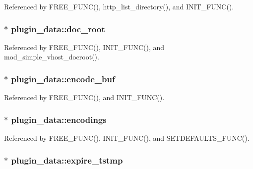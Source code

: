 Referenced by F\-R\-E\-E\-\_\-\-F\-U\-N\-C(), http\-\_\-list\-\_\-directory(), and I\-N\-I\-T\-\_\-\-F\-U\-N\-C().

\hypertarget{structplugin__data_a342f1b1bdc9bf699b19bfe32483d24a5}{
\subsubsection[{doc\-\_\-root}]{$\ast$ plugin\-\_\-data\-::doc\-\_\-root}}\label{structplugin__data_a342f1b1bdc9bf699b19bfe32483d24a5}


Referenced by F\-R\-E\-E\-\_\-\-F\-U\-N\-C(), I\-N\-I\-T\-\_\-\-F\-U\-N\-C(), and mod\-\_\-simple\-\_\-vhost\-\_\-docroot().

\hypertarget{structplugin__data_a2c4aaed97abc0e07dd9bd98f163e0aa8}{
\subsubsection[{encode\-\_\-buf}]{$\ast$ plugin\-\_\-data\-::encode\-\_\-buf}}\label{structplugin__data_a2c4aaed97abc0e07dd9bd98f163e0aa8}


Referenced by F\-R\-E\-E\-\_\-\-F\-U\-N\-C(), and I\-N\-I\-T\-\_\-\-F\-U\-N\-C().

\hypertarget{structplugin__data_a0ca98bb7bcec53210ee355e65457fb41}{
\subsubsection[{encodings}]{$\ast$ plugin\-\_\-data\-::encodings}}\label{structplugin__data_a0ca98bb7bcec53210ee355e65457fb41}


Referenced by F\-R\-E\-E\-\_\-\-F\-U\-N\-C(), I\-N\-I\-T\-\_\-\-F\-U\-N\-C(), and S\-E\-T\-D\-E\-F\-A\-U\-L\-T\-S\-\_\-\-F\-U\-N\-C().

\hypertarget{structplugin__data_ab7ad8e68f07c14a0f4d95da970387826}{
\subsubsection[{expire\-\_\-tstmp}]{$\ast$ plugin\-\_\-data\-::expire\-\_\-tstmp}}\label{structplugin__data_ab7ad8e68f07c14a0f4d95da970387826}


